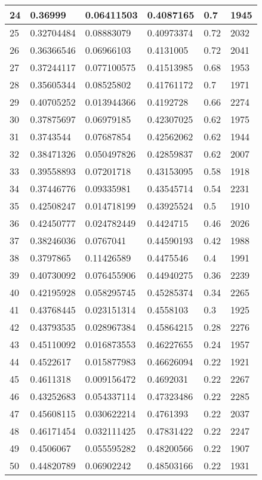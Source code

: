 \begin{longtable}{|l|l|l|l|l|l|}
24 & 0.36999 & 0.06411503 & 0.4087165 & 0.7 & 1945 \\ \hline 
25 & 0.32704484 & 0.08883079 & 0.40973374 & 0.72 & 2032 \\ \hline 
26 & 0.36366546 & 0.06966103 & 0.4131005 & 0.72 & 2041 \\ \hline 
27 & 0.37244117 & 0.077100575 & 0.41513985 & 0.68 & 1953 \\ \hline 
28 & 0.35605344 & 0.08525802 & 0.41761172 & 0.7 & 1971 \\ \hline 
29 & 0.40705252 & 0.013944366 & 0.4192728 & 0.66 & 2274 \\ \hline 
30 & 0.37875697 & 0.06979185 & 0.42307025 & 0.62 & 1975 \\ \hline 
31 & 0.3743544 & 0.07687854 & 0.42562062 & 0.62 & 1944 \\ \hline 
32 & 0.38471326 & 0.050497826 & 0.42859837 & 0.62 & 2007 \\ \hline 
33 & 0.39558893 & 0.07201718 & 0.43153095 & 0.58 & 1918 \\ \hline 
34 & 0.37446776 & 0.09335981 & 0.43545714 & 0.54 & 2231 \\ \hline 
35 & 0.42508247 & 0.014718199 & 0.43925524 & 0.5 & 1910 \\ \hline 
36 & 0.42450777 & 0.024782449 & 0.4424715 & 0.46 & 2026 \\ \hline 
37 & 0.38246036 & 0.0767041 & 0.44590193 & 0.42 & 1988 \\ \hline 
38 & 0.3797865 & 0.11426589 & 0.4475546 & 0.4 & 1991 \\ \hline 
39 & 0.40730092 & 0.076455906 & 0.44940275 & 0.36 & 2239 \\ \hline 
40 & 0.42195928 & 0.058295745 & 0.45285374 & 0.34 & 2265 \\ \hline 
41 & 0.43768445 & 0.023151314 & 0.4558103 & 0.3 & 1925 \\ \hline 
42 & 0.43793535 & 0.028967384 & 0.45864215 & 0.28 & 2276 \\ \hline 
43 & 0.45110092 & 0.016873553 & 0.46227655 & 0.24 & 1957 \\ \hline 
44 & 0.4522617 & 0.015877983 & 0.46626094 & 0.22 & 1921 \\ \hline 
45 & 0.4611318 & 0.009156472 & 0.4692031 & 0.22 & 2267 \\ \hline 
46 & 0.43252683 & 0.054337114 & 0.47323486 & 0.22 & 2285 \\ \hline 
47 & 0.45608115 & 0.030622214 & 0.4761393 & 0.22 & 2037 \\ \hline 
48 & 0.46171454 & 0.032111425 & 0.47831422 & 0.22 & 2247 \\ \hline 
49 & 0.4506067 & 0.055595282 & 0.48200566 & 0.22 & 1907 \\ \hline 
50 & 0.44820789 & 0.06902242 & 0.48503166 & 0.22 & 1931 \\ \hline 
\end{longtable}